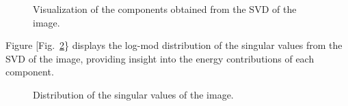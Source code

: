 \documentclass[
  journal,
]{IEEEtran}%
\begin{document}
\begin{figure}


\caption{\label{fig-SVD_components}Visualization of the components
obtained from the SVD of the image.}

\end{figure}%

Figure {[}Fig.~\ref{fig-singular_value_distribution}\} displays the
log-mod distribution of the singular values from the SVD of the image,
providing insight into the energy contributions of each component.

\begin{figure}


\caption{\label{fig-singular_value_distribution}Distribution of the
singular values of the image.}

\end{figure}%
\end{document}
